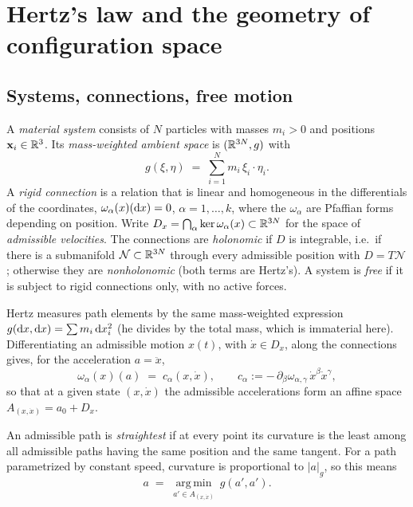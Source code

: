 \section{Hertz's law and the geometry of configuration space}
\label{sec:hz-geometry}

\subsection{Systems, connections, free motion}

\begin{definition}\label{def:hz-system}
A \emph{material system} consists of $N$ particles with masses $m_i>0$ and
positions $\mathbf x_i\in\mathbb{R}^3$. Its \emph{mass-weighted ambient space} is
$(\mathbb{R}^{3N},g)$ with
\[
  g(\xi,\eta)\;=\;\sum_{i=1}^{N}m_i\,\xi_i\!\cdot\eta_i .
\]
A \emph{rigid connection} is a relation that is linear and homogeneous in
the differentials of the coordinates, $\omega_\alpha(x)(\mathrm{d} x)=0$,
$\alpha=1,\dots,k$, where the $\omega_\alpha$ are Pfaffian forms depending
on position. Write
$D_x=\bigcap_\alpha\ker\omega_\alpha(x)\subset\mathbb{R}^{3N}$ for the space of
\emph{admissible velocities}. The connections are \emph{holonomic} if $D$
is integrable, i.e.\ if there is a submanifold $\mathcal N\subset\mathbb{R}^{3N}$
through every admissible position with $D=T\mathcal N$; otherwise they are
\emph{nonholonomic} (both terms are Hertz's). A system is \emph{free} if
it is subject to rigid connections only, with no active forces.
\end{definition}

Hertz measures path elements by the same mass-weighted expression
$g(\mathrm{d} x,\mathrm{d} x)=\sum m_i\,\mathrm{d} x_i^2$ (he divides by the total mass, which is
immaterial here). Differentiating an admissible motion $x(t)$, with
$\dot x\in D_x$, along the connections gives, for the acceleration $a=\ddot x$,
\[
  \omega_\alpha(x)(a)\;=\;c_\alpha(x,\dot x),
  \qquad
  c_\alpha:=-\,\partial_\beta\omega_{\alpha,\gamma}\,\dot x^\beta\dot x^\gamma ,
\]
so that at a given state $(x,\dot x)$ the admissible accelerations form an
affine space $A_{(x,\dot x)}=a_0+D_x$.

\begin{definition}\label{def:hz-straightest}
An admissible path is \emph{straightest} if at every point its curvature
is the least among all admissible paths having the same position and the
same tangent. For a path parametrized by constant speed, curvature is
proportional to $|a|_g$, so this means
\[
  a\;=\;\operatorname*{arg\,min}_{a'\in A_{(x,\dot x)}}\ g(a',a').
\]
\end{definition}

